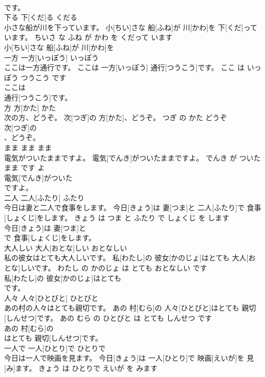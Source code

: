 \documentclass[8pt]{extreport}
\begin{document}
\begin{CJK}{UTF8}{min}
\\	です。		
\\	下る	下[くだ]る	くだる	
\\	小さな船が川を下っています。	小[ちい]さな 船[ふね]が 川[かわ]を 下[くだ]っています。	ちいさ な ふね が かわ を くだって います	
\\	小[ちい]さな 船[ふね]が 川[かわ]を
\\	一方	一方[いっぽう]	いっぽう	
\\	ここは一方通行です。	ここは 一方[いっぽう] 通行[つうこう]です。	ここ は いっぽう つうこう です	
\\	ここは
\\	通行[つうこう]です。		
\\	方	方[かた]	かた	
\\	次の方、どうぞ。	次[つぎ]の 方[かた]、どうぞ。	つぎ の かた どうぞ	
\\	次[つぎ]の
\\	、どうぞ。		
\\	まま	まま	まま	
\\	電気がついたままですよ。	電気[でんき]がついたままですよ。	でんき が ついた まま です よ	
\\	電気[でんき]がついた
\\	ですよ。		
\\	二人	二人[ふたり]	ふたり	
\\	今日は妻と二人で食事をします。	今日[きょう]は 妻[つま]と 二人[ふたり]で 食事[しょくじ]をします。	きょう は つま と ふたり で しょくじ を します	
\\	今日[きょう]は 妻[つま]と
\\	で 食事[しょくじ]をします。		
\\	大人しい	大人[おとな]しい	おとなしい	
\\	私の彼女はとても大人しいです。	私[わたし]の 彼女[かのじょ]はとても 大人[おとな]しいです。	わたし の かのじょ は とても おとなしい です	
\\	私[わたし]の 彼女[かのじょ]はとても
\\	です。		
\\	人々	人々[ひとびと]	ひとびと	
\\	あの村の人々はとても親切です。	あの 村[むら]の 人々[ひとびと]はとても 親切[しんせつ]です。	あの むら の ひとびと は とても しんせつ です	
\\	あの 村[むら]の
\\	はとても 親切[しんせつ]です。		
\\	一人で	一人[ひとり]で	ひとりで	
\\	今日は一人で映画を見ます。	今日[きょう]は 一人[ひとり]で 映画[えいが]を 見[み]ます。	きょう は ひとりで えいが を みます	

\end{CJK}
\end{document}
